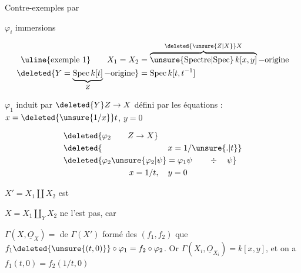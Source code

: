 

Contre-exemples par 

$\varphi_i$ immersions

\[
\begin{aligned}
\text{\uline{exemple 1}} \qquad X_1=X_2&=\overbrace{\operatorname{\unsure{Spectre|Spec}} k[x,y]}^{\deleted{\unsure{Z|X}}X}-\text{origine}\\
\deleted{Y=\underbrace{\operatorname{Spec}k[t]}_{Z}-\text{origine}}&=\operatorname{Spec} k[t,t^{-1}]
\end{aligned}
\]

$\varphi_1$ induit par  $\deleted{Y}Z\to X$ défini par les équations : \quad $x=\deleted{\unsure{1/x}}t$, $y=0$


\[
\begin{aligned}
&\deleted{\varphi_2\qquad Z\to X}\\
&\deleted{\hspace{8em}x=1/\unsure{.|t}}\\
&\deleted{\varphi_2\unsure{\varphi_2|\psi}=\varphi_1\psi\qquad\div\quad\psi}\\
&\hspace{8em}x=1/t,\quad y=0
\end{aligned}
\]

$X'=X_1\amalg X_2$ est 

$X=X_1\amalg_Y X_2$ ne l'est pas, car

$\Gamma(X,\underline O_X)={}$   de $\Gamma(X')$ formé des $(f_1,f_2)$  que $f_1\deleted{\unsure{(t,0)}}\circ\varphi_1=f_2\circ\varphi_2$. Or $\Gamma(X_i,\underline O_{X_i})=k[x,y]$, et on a $f_1(t,0)=f_2(1/t,0)$


